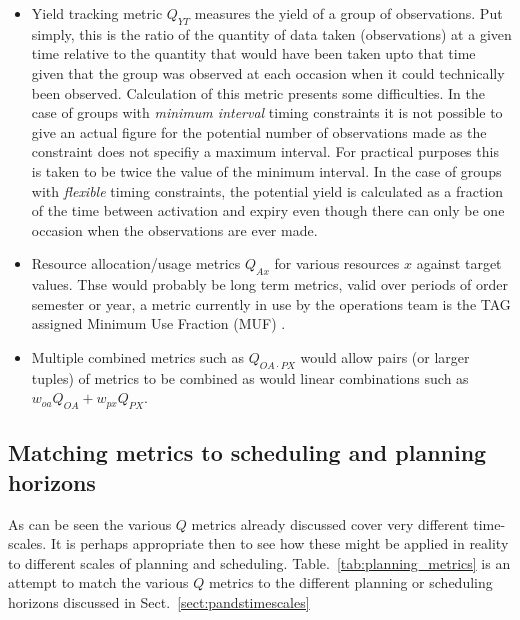 \begin{itemize}
\item Yield tracking metric $Q_{YT}$ measures the yield of a group of observations. Put simply, this is the ratio of the quantity of data taken (observations) at a given time relative to the quantity that would have been taken upto that time given that the group was observed at each occasion when it could technically been observed. Calculation of this metric presents some difficulties. In the case of groups with \emph{minimum interval} timing constraints it is not possible to give an actual figure for the potential number of observations made as the constraint does not specifiy a maximum interval. For practical purposes this is taken to be twice the value of the minimum interval. In the case of groups with \emph{flexible} timing constraints, the potential yield is calculated as a fraction of the time between activation and expiry even though there can only be one occasion when the observations are ever made. 

\item Resource allocation/usage metrics $Q_{Ax}$ for various resources $x$ against target values. Thse would probably be long term metrics, valid over periods of order semester or year, a metric currently in use by the operations team is the TAG assigned Minimum Use Fraction (MUF) .

\item Multiple combined metrics such as $Q_{OA \cdot PX}$ would allow pairs (or larger tuples) of metrics to be combined as would linear combinations such as $w_{oa}Q_{OA}+w_{px}Q_{PX}$. 

\end{itemize}


\subsection{Matching metrics to scheduling and planning horizons}
\label{sect:matchmetrics}
As can be seen the various $Q$ metrics already discussed cover very different time-scales. It is perhaps appropriate then to see how these might be applied in reality to different scales of planning and scheduling. Table.~\ref{tab:planning_metrics} is an attempt to match the various $Q$ metrics to the different planning or scheduling horizons discussed in Sect.~\ref{sect:pandstimescales}


